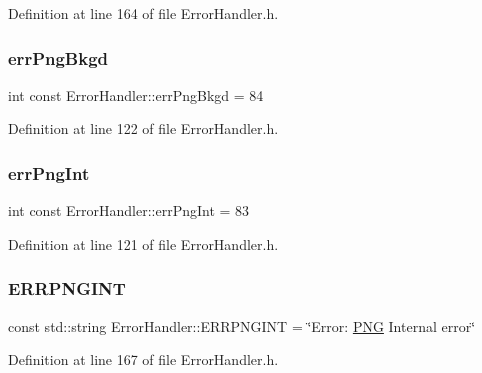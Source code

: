 Definition at line 164 of file Error\+Handler.\+h.

\mbox{\label{classErrorHandler_ab207964238bf9d2c00f623d6a045fa9f}} 
\subsubsection{\texorpdfstring{errPngBkgd}{errPngBkgd}}
{\footnotesize\ttfamily int const Error\+Handler\+::err\+Png\+Bkgd = 84\hspace{0.3cm}{\ttfamily [static]}}



Definition at line 122 of file Error\+Handler.\+h.

\mbox{\label{classErrorHandler_a6d977525061671cc3f510123163e4ce6}} 
\subsubsection{\texorpdfstring{errPngInt}{errPngInt}}
{\footnotesize\ttfamily int const Error\+Handler\+::err\+Png\+Int = 83\hspace{0.3cm}{\ttfamily [static]}}



Definition at line 121 of file Error\+Handler.\+h.

\mbox{\label{classErrorHandler_a050e436624ffa1bf418075c4d20befe7}} 
\subsubsection{\texorpdfstring{ERRPNGINT}{ERRPNGINT}}
{\footnotesize\ttfamily const std\+::string Error\+Handler\+::\+E\+R\+R\+P\+N\+G\+I\+NT = \char`\"{}Error\+: \mbox{\hyperlink{constants_8h_afac9cfa577b92c66f46f7603f2f9fc14}{P\+NG}} Internal error\char`\"{}\hspace{0.3cm}{\ttfamily [static]}}



Definition at line 167 of file Error\+Handler.\+h.

\mbox{\label{classErrorHandler_ad9b65ee3a71ddf4ef50a83035236a41b}} 
